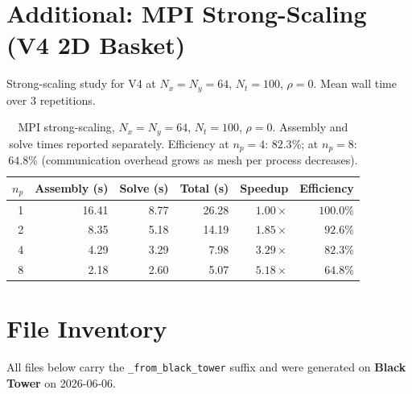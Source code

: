 \documentclass[11pt,a4paper]{article}
\newcommand{\machinename}{Black Tower}
\newcommand{\rundate}{2026-06-06}
\begin{document}
\section{Additional: MPI Strong-Scaling (V4 2D Basket)}

Strong-scaling study for V4 at $N_x=N_y=64$, $N_t=100$, $\rho=0$.
Mean wall time over 3 repetitions.

\begin{table}[H]
\centering
\caption{MPI strong-scaling, $N_x=N_y=64$, $N_t=100$, $\rho=0$.
Assembly and solve times reported separately.
Efficiency at $n_p=4$: $82.3\%$; at $n_p=8$: $64.8\%$ (communication overhead
grows as mesh per process decreases).}
\label{tab:mpi}
\begin{tabular}{rrrrrr}
\toprule
$n_p$ & Assembly (s) & Solve (s) & Total (s) & Speedup & Efficiency \\
\midrule
1 & 16.41 & 8.77 & 26.28 & $1.00\times$ & $100.0\%$ \\
2 &  8.35 & 5.18 & 14.19 & $1.85\times$ &  $92.6\%$ \\
4 &  4.29 & 3.29 &  7.98 & $3.29\times$ &  $82.3\%$ \\
8 &  2.18 & 2.60 &  5.07 & $5.18\times$ &  $64.8\%$ \\
\bottomrule
\end{tabular}
\end{table}

\section{File Inventory}

All files below carry the \texttt{\_from\_black\_tower} suffix and were
generated on \textbf{\machinename} on \rundate.
\end{document}

